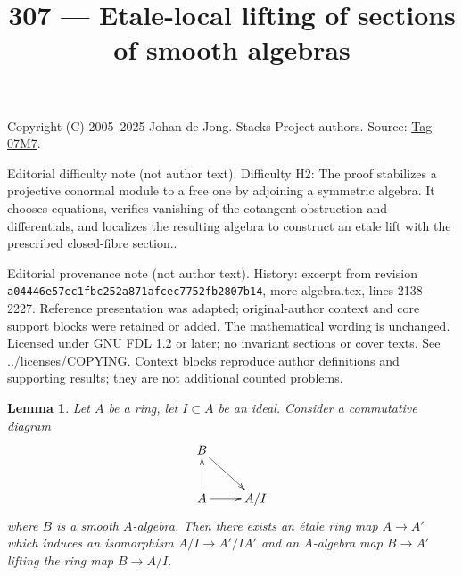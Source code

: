 \documentclass{amsart}
\theoremstyle{plain}
\newtheorem{lemma}[subsection]{Lemma}
\theoremstyle{definition}
\theoremstyle{remark}
\numberwithin{equation}{subsection}
\begin{document}
\title[Stacks Project, Tag 07M7]{307 --- Etale-local lifting of sections of smooth algebras}
\maketitle
\noindent Copyright (C) 2005--2025 Johan de Jong. Stacks Project authors. Source: \href{https://stacks.math.columbia.edu/tag/07M7}{Tag 07M7}.

\noindent Editorial difficulty note (not author text). Difficulty H2: The proof stabilizes a projective conormal module to a free one by adjoining a symmetric algebra. It chooses equations, verifies vanishing of the cotangent obstruction and differentials, and localizes the resulting algebra to construct an etale lift with the prescribed closed-fibre section..

\noindent Editorial provenance note (not author text). History: excerpt from revision \texttt{a0444\allowbreak 6e57e\allowbreak c1fbc\allowbreak 252a8\allowbreak 71afc\allowbreak ec775\allowbreak 2fb28\allowbreak 07b14}, more-algebra.tex, lines 2138--2227. Reference presentation was adapted; original-author context and core support blocks were retained or added. The mathematical wording is unchanged. Licensed under GNU FDL 1.2 or later; no invariant sections or cover texts. See ../licenses/COPYING. Context blocks reproduce author definitions and supporting results; they are not additional counted problems.

\begin{lemma}
\label{lemma-lift-section-smooth-morphism}
Let $A$ be a ring, let $I \subset A$ be an ideal. Consider a commutative
diagram
$$
\xymatrix{
B \ar[rd] \\
A \ar[u] \ar[r] & A/I
}
$$
where $B$ is a smooth $A$-algebra. Then there exists an \'etale ring
map $A \to A'$ which induces an isomorphism $A/I \to A'/IA'$ and an
$A$-algebra map $B \to A'$ lifting the ring map $B \to A/I$.
\end{lemma}
\end{document}
